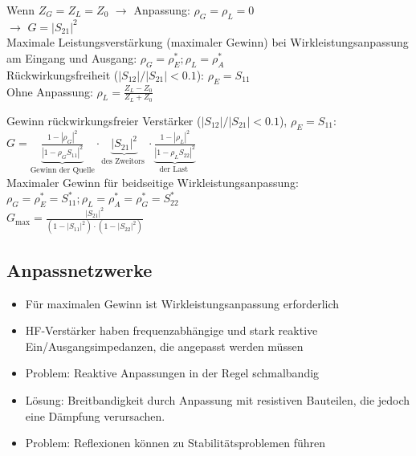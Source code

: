 \documentclass[english]{latex4ei/latex4ei_sheet}
\begin{document}
\begin{sectionbox}
	Wenn $Z_G = Z_L = Z_0$ $\rightarrow$ Anpassung: $\rho_G = \rho_L = 0$\\
	$\rightarrow$ $G = |S_{21}|^2$\\
	
	Maximale Leistungsverstärkung (maximaler Gewinn) bei Wirkleistungsanpassung am Eingang und Ausgang:
	$\rho_{G}=\rho_{E}^{*} ; \rho_{L}=\rho_{A}^{*}$\\

	Rückwirkungsfreiheit ($|S_{12}| / |S_{21}| < 0.1$): $\rho_{E} = S_{11}$\\

	Ohne Anpassung: $\rho_{L} = \frac{Z_{L}-Z_{0}}{Z_{L}+Z_{0}}$ \\
	\begin{emphbox}
		Gewinn rückwirkungsfreier Verstärker ($|S_{12}| / |S_{21}| < 0.1$), $\rho_{E}=S_{11}$:\\
		$G=\underbrace{\frac{1-\left|\rho_{G}\right|^{2}} {\left|1-\rho_{G} S_{11}\right|^{2}}}_{\text{Gewinn der Quelle}}\cdot \underbrace{\left|S_{21}\right|^{2}}_{\text {des Zweitors }} \cdot  \underbrace{\frac{1-\left|\rho_{L}\right|^{2}}{\left|1-\rho_{L} S_{22}\right|^{2}}}_{\text {der Last }}$\\
		
		Maximaler Gewinn für beidseitige Wirkleistungsanpassung: $\rho_{G}=\rho_{E}^{*}=S_{11}^{*} ; \rho_{L}=\rho_{A}^{*}=\rho_{G}^{*}=S_{22}^{*}$\\
		$G_{\max }=\frac{\left|S_{21}\right|^{2}}{\left(1-\left|S_{11}\right|^{2}\right) \cdot\left(1-\left|S_{22}\right|^{2}\right)}$
	\end{emphbox}
\end{sectionbox}	
\begin{sectionbox}
	\subsection{Anpassnetzwerke}
	\begin{itemize}
		\item Für maximalen Gewinn ist Wirkleistungsanpassung erforderlich
		\item HF-Verstärker haben frequenzabhängige und stark reaktive Ein/Ausgangsimpedanzen, die angepasst werden müssen
		\item Problem: Reaktive Anpassungen in der Regel schmalbandig
		\item Lösung: Breitbandigkeit durch Anpassung mit resistiven Bauteilen, die jedoch eine Dämpfung verursachen.
		\item Problem: Reflexionen können zu Stabilitätsproblemen führen
	\end{itemize}
\end{sectionbox}
\end{document}
